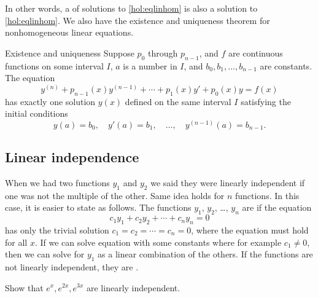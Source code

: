 In other words, a \emph{} of solutions
to \eqref{hol:eqlinhom}
is also a solution to \eqref{hol:eqlinhom}.
We also have the existence and uniqueness theorem for nonhomogeneous linear
equations.

\begin{theorem1}{Existence and uniqueness}
Suppose $p_0$ through $p_{n-1}$, and $f$ are continuous functions
on some interval $I$,
$a$ is a number in $I$,
and $b_0, b_1, \ldots, b_{n-1}$ are constants.
The equation
\begin{equation*} %
y^{(n)} + p_{n-1}(x)y^{(n-1)} + \cdots + p_1(x) y' + p_0(x) y = f(x) 
\end{equation*}
has exactly one solution $y(x)$ defined on the same interval $I$
satisfying the initial conditions
\begin{equation*}
y(a) = b_0, \quad y'(a) = b_1, \quad \ldots, \quad y^{(n-1)}(a) = b_{n-1} .
\end{equation*}
\end{theorem1}

\subsection{Linear independence}

When we had two functions $y_1$ and $y_2$ we said they were linearly
independent if one was not the multiple of the other.  Same idea holds for
$n$ functions.  In this case, it is easier to state as follows. The functions
$y_1$, $y_2$, \ldots, $y_n$ are \emph{} if
the equation
\begin{equation*}
c_1 y_1 + c_2 y_2 + \cdots + c_n y_n = 0 
\end{equation*}
has only the trivial solution $c_1 = c_2 = \cdots = c_n = 0$, where the
equation must hold for all $x$.  If we can
solve equation with some constants where for example $c_1 \not= 0$, then we
can solve for $y_1$ as a linear combination of the others.  If the functions
are not
linearly independent, they are \emph{}.

\begin{example}
Show that $e^x, e^{2x}, e^{3x}$ are linearly independent.
\end{example}

